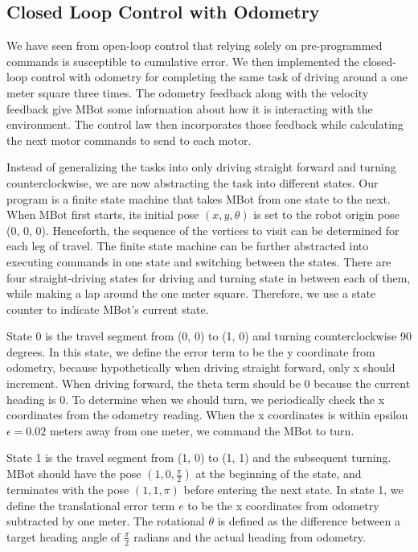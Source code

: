 \documentclass[conference]{IEEEtran}
\begin{document}
\subsection{Closed Loop Control with Odometry}
We have seen from open-loop control that relying solely on pre-programmed commands is susceptible to cumulative error. We then implemented the closed-loop control with odometry for completing the same task of driving around a one meter square three times. The odometry feedback along with the velocity feedback give MBot some information about how it is interacting with the environment. The control law then incorporates those feedback while calculating the next motor commands to send to each motor.

Instead of generalizing the tasks into only driving straight forward and turning counterclockwise, we are now abstracting the task into different states. Our program is a finite state machine that takes MBot from one state to the next. When MBot first starts, its initial pose $(x, y, \theta)$ is set to the robot origin pose (0, 0, 0). Henceforth, the sequence of the vertices to visit can be determined for each leg of travel. The finite state machine can be further abstracted into executing commands in one state and switching between the states. There are four straight-driving states for driving and turning state in between each of them, while making a lap around the one meter square. Therefore, we use a state counter to indicate MBot's current state.

State 0 is the travel segment from (0, 0) to (1, 0) and turning counterclockwise 90 degrees. In this state, we define the error term to be the y coordinate from odometry, because hypothetically when driving straight forward, only x should increment. When driving forward, the theta term should be 0 because the current heading is 0. To determine when we should turn, we periodically check the x coordinates from the odometry reading. When the x coordinates is within epsilon $\epsilon = 0.02$ meters away from one meter, we command the MBot to turn.

State 1 is the travel segment from (1, 0) to (1, 1) and the subsequent turning. MBot should have the pose $(1, 0, \frac{\pi}{2})$ at the beginning of the state, and terminates with the pose $(1, 1, \pi)$ before entering the next state. In state 1, we define the translational error term $e$ to be the x coordinates from odometry subtracted by one meter. The rotational $\theta$ is defined as the difference between a target heading angle of $\frac{\pi}{2}$ radians and the actual heading from odometry.
\end{document}

